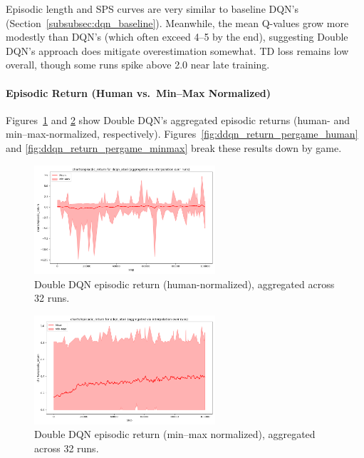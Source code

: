 Episodic length and SPS curves are very similar to baseline DQN’s (Section~\ref{subsubsec:dqn_baseline}). 
Meanwhile, the mean Q-values grow more modestly than DQN’s (which often exceed 4--5 by the end), suggesting 
Double DQN’s approach does mitigate overestimation somewhat. 
TD loss remains low overall, though some runs spike above 2.0 near late training.

\paragraph{Episodic Return (Human vs.\ Min--Max Normalized)}
Figures~\ref{fig:ddqn_return_human} and \ref{fig:ddqn_return_minmax} show Double DQN’s aggregated episodic returns (human- and min--max-normalized, respectively). 
Figures~\ref{fig:ddqn_return_pergame_human} and \ref{fig:ddqn_return_pergame_minmax} break these results down by game.

\begin{figure}
	\centering
	\includegraphics[width=0.6\textwidth]{figures/ddqn/charts_episodic_return_human_ddqn_atari.png}
	\caption{Double DQN episodic return (human-normalized), aggregated across 32 runs.}
	\label{fig:ddqn_return_human}
\end{figure}

\begin{figure}
	\centering
	\includegraphics[width=0.6\textwidth]{figures/ddqn/charts_episodic_return_minmax_ddqn_atari.png}
	\caption{Double DQN episodic return (min--max normalized), aggregated across 32 runs.}
	\label{fig:ddqn_return_minmax}
\end{figure}

